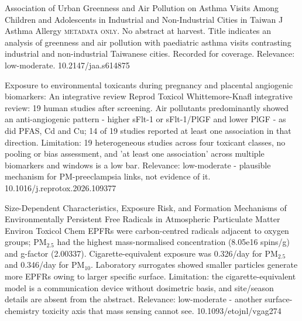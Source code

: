 \documentclass[10pt]{article}
\begin{document}
{Association of Urban Greenness and Air Pollution on Asthma Visits Among Children and Adolescents in Industrial and Non-Industrial Cities in Taiwan}
{J Asthma Allergy}
{\textsc{metadata only.} No abstract at harvest. Title indicates an analysis of greenness and air pollution with paediatric asthma visits contrasting industrial and non-industrial Taiwanese cities. Recorded for coverage. Relevance: low-moderate.}
{10.2147/jaa.s614875}

\par{}\baselineskip{}\baselineskip
{}

{Exposure to environmental toxicants during pregnancy and placental angiogenic biomarkers: An integrative review}
{Reprod Toxicol}
{Whittemore-Knafl integrative review: 19 human studies after screening. Air pollutants predominantly showed an anti-angiogenic pattern - higher sFlt-1 or sFlt-1/PlGF and lower PlGF - as did PFAS, Cd and Cu; 14 of 19 studies reported at least one association in that direction. Limitation: 19 heterogeneous studies across four toxicant classes, no pooling or bias assessment, and 'at least one association' across multiple biomarkers and windows is a low bar. Relevance: low-moderate - plausible mechanism for PM-preeclampsia links, not evidence of it.}
{10.1016/j.reprotox.2026.109377}

\par{}\baselineskip{}\baselineskip
{}

{Size-Dependent Characteristics, Exposure Risk, and Formation Mechanisms of Environmentally Persistent Free Radicals in Atmospheric Particulate Matter}
{Environ Toxicol Chem}
{EPFRs were carbon-centred radicals adjacent to oxygen groups; PM$_{2.5}$ had the highest mass-normalised concentration (8.05e16 spins/g) and g-factor (2.00337). Cigarette-equivalent exposure was 0.326/day for PM$_{2.5}$ and 0.346/day for PM$_{10}$. Laboratory surrogates showed smaller particles generate more EPFRs owing to larger specific surface. Limitation: the cigarette-equivalent model is a communication device without dosimetric basis, and site/season details are absent from the abstract. Relevance: low-moderate - another surface-chemistry toxicity axis that mass sensing cannot see.}
{10.1093/etojnl/vgag274}
\end{document}
